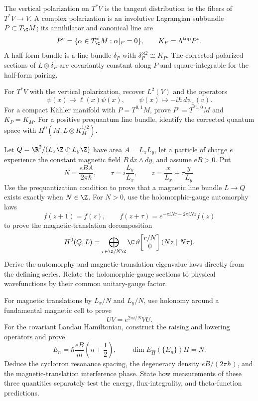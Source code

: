 \begin{exercise}
The vertical polarization on $T^*V$ is the tangent distribution to the
fibers of $T^*V\to V$.  A complex polarization is an involutive Lagrangian
subbundle $P\subset T_\C M$; its annihilator and canonical line are
\[
P^\circ=\{\alpha\in T_\C^*M:\alpha|_P=0\},
\qquad K_P=\Lambda^{\rm top}P^\circ.
\]
A half-form bundle is a line bundle $\delta_P$ with
$\delta_P^{\otimes2}\cong K_P$.  The corrected polarized sections of
$L\otimes\delta_P$ are covariantly constant along $P$ and square-integrable
for the half-form pairing.

For $T^*V$ with the vertical polarization, recover $L^2(V)$ and the
operators
\[
\psi(x)\longmapsto \ell(x)\psi(x),
\qquad
\psi(x)\longmapsto-i\hbar\,d\psi_x(v).
\]
For a compact
K\"ahler manifold with $P=T^{0,1}M$, prove $P^\circ=T^{*1,0}M$ and
$K_P=K_M$.  For a positive prequantum line bundle, identify the
corrected quantum space with
$H^0(M,L\otimes K_M^{1/2})$.
\end{exercise}


\begin{exercise}
Let
$Q=\R^2/(L_x\Z\oplus L_y\Z)$ have area $A=L_xL_y$, let a particle of
charge $e$ experience the constant magnetic field $B\,dx\wedge dy$, and
assume $eB>0$.  Put
\[
N=\frac{eBA}{2\pi\hbar},
\qquad
\tau=i\frac{L_y}{L_x},
\qquad
z=\frac{x}{L_x}+\tau\frac{y}{L_y}.
\]
Use the prequantization condition to prove that a magnetic line bundle
$L\to Q$ exists exactly when $N\in\Z$.  For $N>0$, use the holomorphic-gauge
automorphy laws
\[
f(z+1)=f(z),
\qquad
f(z+\tau)=e^{-\pi iN\tau-2\pi iNz}f(z)
\]
to prove the magnetic-translation decomposition
\[
H^0(Q,L)
=\bigoplus_{r\in\Z/N\Z}
\C\,\vartheta\!\begin{bmatrix}r/N\\0\end{bmatrix}(Nz\mid N\tau).
\]
Derive the automorphy and magnetic-translation eigenvalue laws directly
from the defining series.  Relate the holomorphic-gauge sections to
physical wavefunctions by their common unitary-gauge factor.

For magnetic translations by $L_x/N$ and $L_y/N$, use holonomy around a
fundamental magnetic cell to prove
\[
UV=e^{2\pi i/N}VU.
\]
For the covariant Landau Hamiltonian, construct the raising and lowering
operators and prove
\[
E_n=\hbar\frac{eB}{m}\left(n+\frac12\right),
\qquad
\dim E_{\widehat H}(\{E_n\})H=N.
\]
Deduce the cyclotron resonance spacing, the degeneracy density
$eB/(2\pi\hbar)$, and the magnetic-translation interference phase.
State how measurements of these three quantities separately test the
energy, flux-integrality, and theta-function predictions.
\end{exercise}

